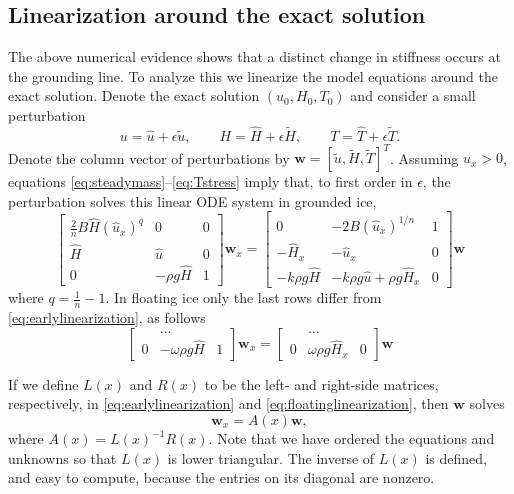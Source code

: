 \documentclass[review,letterpaper]{igs}
\newcommand{\bw}{\mathbf{w}}
\newcommand{\hu}{\hat u}
\newcommand{\hH}{\hat H}
\newcommand{\hT}{\hat T}
\newcommand{\tu}{\tilde u}
\newcommand{\tH}{\tilde H}
\newcommand{\tT}{\tilde T}
\newcommand{\eps}{\epsilon}
\begin{document}
\subsection*{Linearization around the exact solution}  The above numerical evidence shows that a distinct change in stiffness occurs at the grounding line.  To analyze this we linearize the model equations around the exact solution.  Denote the exact solution $(u_0,H_0,T_0)$ and consider a small perturbation
\begin{equation}
u = \hu + \eps \tu, \qquad H = \hH + \eps \tH, \qquad T = \hT + \eps \tT. \label{eq:perturbation}
\end{equation}
Denote the column vector of perturbations by $\bw = [\tu, \tH, \tT]^T$.  Assuming $u_x > 0$, equations \eqref{eq:steadymass}--\eqref{eq:Tstress} imply that, to first order in $\eps$, the perturbation solves this linear ODE system in grounded ice,
\begin{equation}
\begin{bmatrix}
\frac{2}{n} B \hH (\hu_x)^q & 0 & 0 \\
\hH & \hu & 0 \\
0 & -\rho g \hH & 1
\end{bmatrix}
\bw_x
=
\begin{bmatrix}
0 & - 2 B (\hu_x)^{1/n} & 1 \\
- \hH_x & - \hu_x & 0 \\
-k \rho g \hH & - k \rho g \hu + \rho g \hH_x & 0
\end{bmatrix}
\bw
\label{eq:earlylinearization}
\end{equation}
where $q = \frac{1}{n} - 1$.  In floating ice only the last rows differ from \eqref{eq:earlylinearization}, as follows
\begin{equation}
\begin{bmatrix}
 & \dots & \\
0 & - \omega \rho g \hH & 1
\end{bmatrix}
\bw_x
=
\begin{bmatrix}
 & \dots & \\
0 & \omega \rho g \hH_x & 0
\end{bmatrix}
\bw
\label{eq:floatinglinearization}
\end{equation}

If we define $L(x)$ and $R(x)$ to be the left- and right-side matrices, respectively, in \eqref{eq:earlylinearization} and \eqref{eq:floatinglinearization}, then $\bw$ solves
\begin{equation}
\bw_x = A(x) \bw, \label{eq:linearization}
\end{equation}
where $A(x) = L(x)^{-1} R(x)$.  Note that we have ordered the equations and unknowns so that $L(x)$ is lower triangular.  The inverse of $L(x)$ is defined, and easy to compute, because the entries on its diagonal are nonzero.
\end{document}
